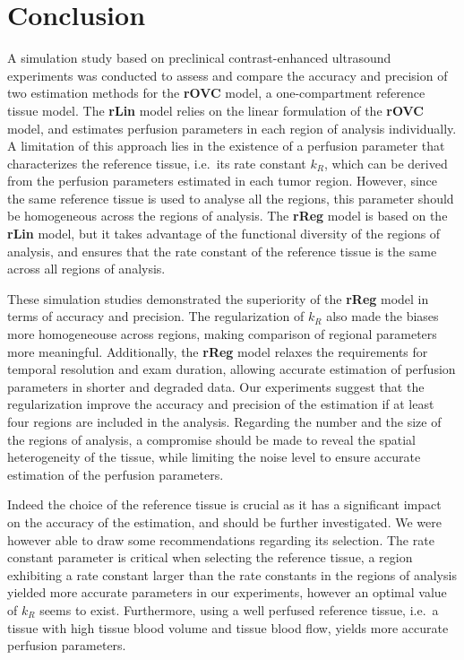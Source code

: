 \section{Conclusion}
A simulation study based on preclinical contrast-enhanced ultrasound experiments was conducted to assess and compare the accuracy and precision of two estimation methods for the \textbf{rOVC} model, a one-compartment reference tissue model.
The \textbf{rLin} model relies on the linear formulation of the \textbf{rOVC} model, and estimates perfusion parameters in each region of analysis individually.
A limitation of this approach lies in the existence of a perfusion parameter that characterizes the reference tissue, i.e.~its rate constant $k_R$, which can be derived from the perfusion parameters estimated in each tumor region.
However, since the same reference tissue is used to analyse all the regions, this parameter should be homogeneous across the regions of analysis.
The \textbf{rReg} model is based on the \textbf{rLin} model, but it takes advantage of the functional diversity of the regions of analysis, and ensures that the rate constant of the reference tissue is the same across all regions of analysis.

These simulation studies demonstrated the superiority of the \textbf{rReg} model in terms of accuracy and precision.
The regularization of $k_R$ also made the biases more homogeneouse across regions, making comparison of regional parameters more meaningful.
Additionally, the \textbf{rReg} model relaxes the requirements for temporal resolution and exam duration, allowing accurate estimation of perfusion parameters in shorter and degraded data.
Our experiments suggest that the regularization improve the accuracy and precision of the estimation if at least four regions are included in the analysis.
Regarding the number and the size of the regions of analysis, a compromise should be made to reveal the spatial heterogeneity of the tissue, while limiting the noise level to ensure accurate estimation of the perfusion parameters.

Indeed the choice of the reference tissue is crucial as it has a significant impact on the accuracy of the estimation, and should be further investigated.
We were however able to draw some recommendations regarding its selection.
The rate constant parameter is critical when selecting the reference tissue, a region exhibiting a rate constant larger than the rate constants in the regions of analysis yielded more accurate parameters in our experiments, however an optimal value of $k_R$ seems to exist.
Furthermore, using a well perfused reference tissue, i.e.~a tissue with high tissue blood volume and tissue blood flow, yields more accurate perfusion parameters.